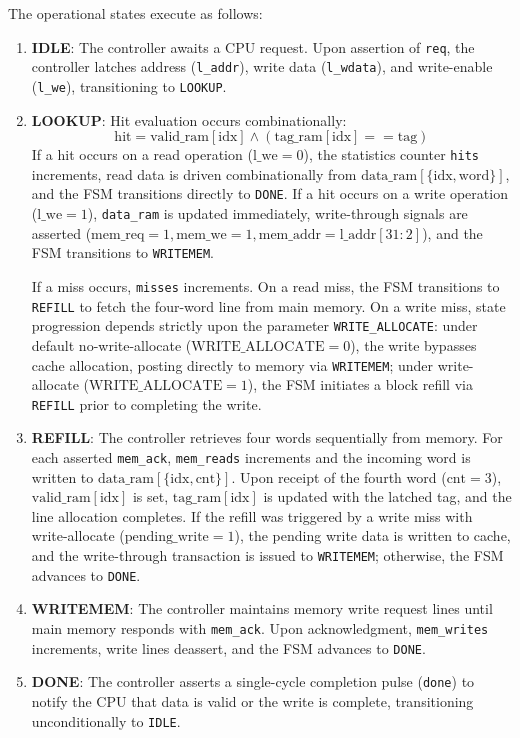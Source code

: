 \documentclass[conference]{IEEEtran}
\begin{document}
The operational states execute as follows:
\begin{enumerate}
    \item \textbf{IDLE}: The controller awaits a CPU request. Upon assertion of \texttt{req}, the controller latches address (\texttt{l\_addr}), write data (\texttt{l\_wdata}), and write-enable (\texttt{l\_we}), transitioning to \texttt{LOOKUP}.
    \item \textbf{LOOKUP}: Hit evaluation occurs combinationally:
    \begin{equation}
        \text{hit} = \text{valid\_ram}[\text{idx}] \land (\text{tag\_ram}[\text{idx}] == \text{tag})
    \end{equation}
    If a hit occurs on a read operation ($\text{l\_we}=0$), the statistics counter \texttt{hits} increments, read data is driven combinationally from $\text{data\_ram}[\{\text{idx}, \text{word}\}]$, and the FSM transitions directly to \texttt{DONE}. If a hit occurs on a write operation ($\text{l\_we}=1$), \texttt{data\_ram} is updated immediately, write-through signals are asserted ($\text{mem\_req}=1, \text{mem\_we}=1, \text{mem\_addr}=\text{l\_addr}[31:2]$), and the FSM transitions to \texttt{WRITEMEM}.
    
    If a miss occurs, \texttt{misses} increments. On a read miss, the FSM transitions to \texttt{REFILL} to fetch the four-word line from main memory. On a write miss, state progression depends strictly upon the parameter \texttt{WRITE\_ALLOCATE}: under default no-write-allocate ($\text{WRITE\_ALLOCATE}=0$), the write bypasses cache allocation, posting directly to memory via \texttt{WRITEMEM}; under write-allocate ($\text{WRITE\_ALLOCATE}=1$), the FSM initiates a block refill via \texttt{REFILL} prior to completing the write.
    \item \textbf{REFILL}: The controller retrieves four words sequentially from memory. For each asserted \texttt{mem\_ack}, \texttt{mem\_reads} increments and the incoming word is written to $\text{data\_ram}[\{\text{idx}, \text{cnt}\}]$. Upon receipt of the fourth word ($\text{cnt}=3$), $\text{valid\_ram}[\text{idx}]$ is set, $\text{tag\_ram}[\text{idx}]$ is updated with the latched tag, and the line allocation completes. If the refill was triggered by a write miss with write-allocate ($\text{pending\_write}=1$), the pending write data is written to cache, and the write-through transaction is issued to \texttt{WRITEMEM}; otherwise, the FSM advances to \texttt{DONE}.
    \item \textbf{WRITEMEM}: The controller maintains memory write request lines until main memory responds with \texttt{mem\_ack}. Upon acknowledgment, \texttt{mem\_writes} increments, write lines deassert, and the FSM advances to \texttt{DONE}.
    \item \textbf{DONE}: The controller asserts a single-cycle completion pulse (\texttt{done}) to notify the CPU that data is valid or the write is complete, transitioning unconditionally to \texttt{IDLE}.
\end{enumerate}
\end{document}
